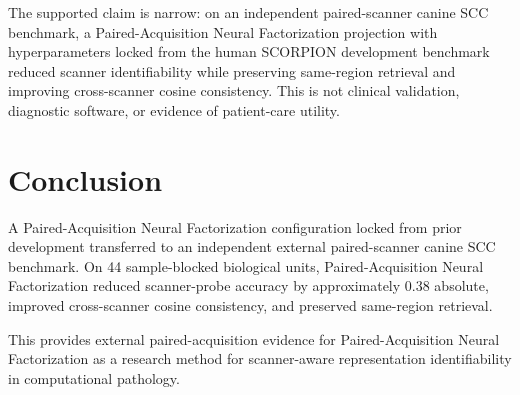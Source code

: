 \documentclass[10pt]{article}
\begin{document}
The supported claim is narrow: on an independent paired-scanner canine SCC benchmark, a Paired-Acquisition Neural Factorization projection with hyperparameters locked from the human SCORPION development benchmark reduced scanner identifiability while preserving same-region retrieval and improving cross-scanner cosine consistency. This is not clinical validation, diagnostic software, or evidence of patient-care utility.

\setlength{\parindent}{0pt}
\setlength{\parskip}{0.54em}

\section{Conclusion}

A Paired-Acquisition Neural Factorization configuration locked from prior development transferred to an independent external paired-scanner canine SCC benchmark. On 44 sample-blocked biological units, Paired-Acquisition Neural Factorization reduced scanner-probe accuracy by approximately 0.38 absolute, improved cross-scanner cosine consistency, and preserved same-region retrieval.

This provides external paired-acquisition evidence for Paired-Acquisition Neural Factorization as a research method for scanner-aware representation identifiability in computational pathology.
\end{document}
